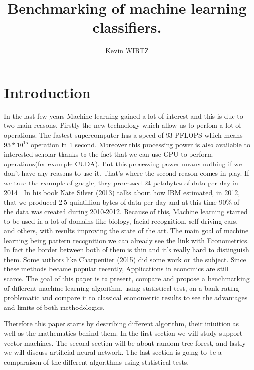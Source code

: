 \documentclass[a4paper,11pt]{article}
\author{Kevin WIRTZ}
\title{Benchmarking of machine learning classifiers.}
\numberwithin{equation}{section}
\begin{document}
\maketitle

\tableofcontents
\newpage

\section{Introduction}
\doublespacing

In the last few years Machine learning gained a lot of interest and this is due to two main reasons. Firstly the new technology which allow us to perfom a lot of operations. The fastest supercomputer has a speed of 93 PFLOPS which means $93*10^{15}$ operation in 1 second. Moreover this processing power is also available to interested scholar thanks to  the fact that we can use GPU to perform operations(for example CUDA). But this processing power means nothing if we don't have any reasons to use it. That's where the second reason comes in play. If we take the example of google, they processed 24 petabytes of data per day in 2014 \cite{google}. In his book Nate Silver (2013) \cite{signalnoise} talks about how IBM estimated, in 2012, that we produced 2.5 quintillion bytes of data per day and at this time 90\% of the data was created during 2010-2012. Because of this, Machine learning started to be used in a lot of domains like biology, facial recognition, self driving cars, and others, with results improving the state of the art. The main goal of machine learning being pattern recognition we can already see the link with Econometrics. In fact the border between both of them is thin and it's really hard to distinguish them. Some authors like Charpentier (2015) \cite{charpentier:hal-01568851} did some work on the subject. Since these methods became popular recently, Applications in economics are still scarce. The goal of this paper is to present, compare and propose a benchmarking of different machine learning algorithm, using statistical test, on a bank rating problematic and compare it to classical econometric results to see the advantages and limits of both methodologies. 

Therefore this paper starts by describing different algorithm, their intuition as well as the mathematics behind them. In the first section we will study support vector machines. The second section will be about random tree forest, and lastly we will discuss artificial neural network. The last section is going to be a comparaison of the different algorithms using statistical tests.
\end{document}
